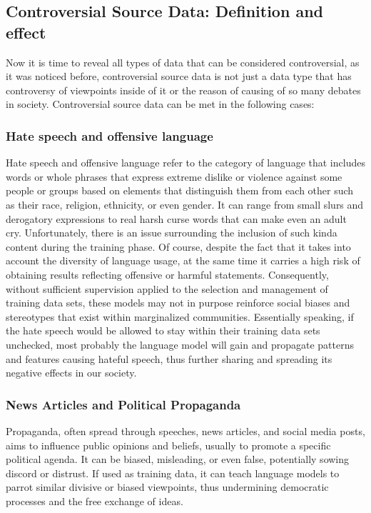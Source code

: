 \subsection{Controversial Source Data: Definition and effect}
Now it is time to reveal all types of data that can be considered controversial, as it was noticed before, controversial source data is not just a data type that has controversy of viewpoints inside of it or the reason of causing of so many debates in society. Controversial source data can be met in the following cases:
\subsubsection{Hate speech and offensive language}Hate speech and offensive language refer to the category of language that includes words or whole phrases that express extreme dislike or violence against some people or groups based on elements that distinguish them from each other such as their race, religion, ethnicity, or even gender. It can range from small slurs and derogatory expressions to real harsh curse words that can make even an adult cry.
Unfortunately, there is an issue surrounding the inclusion of such kinda content during the training phase. Of course, despite the fact that it takes into account the diversity of language usage, at the same time it carries a high risk of obtaining results reflecting offensive or harmful statements. Consequently, without sufficient supervision applied to the selection and management of training data sets, these models may not in purpose reinforce social biases and stereotypes that exist within marginalized communities. Essentially speaking, if the hate speech would be allowed to stay within their training data sets unchecked, most probably the language model will gain and propagate patterns and features causing hateful speech, thus further sharing and spreading its negative effects in our society.\cite{tdd2017}
\subsubsection{News Articles and Political Propaganda}
Propaganda, often spread through speeches, news articles, and social media posts, aims to influence public opinions and beliefs, usually to promote a specific political agenda. It can be biased, misleading, or even false, potentially sowing discord or distrust. If used as training data, it can teach language models to parrot similar divisive or biased viewpoints, thus undermining democratic processes and the free exchange of ideas.

